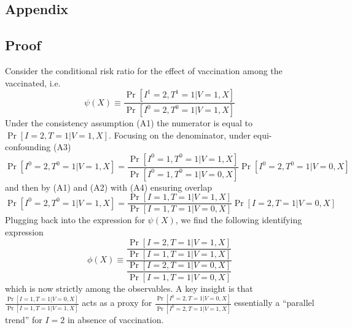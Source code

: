 
\begin{appendix}

    \renewcommand{\thefigure}{A\arabic{figure}}
    \setcounter{figure}{0}
    
    \renewcommand{\thetable}{A\arabic{table}}
    \setcounter{table}{0}
    
    \renewcommand{\theequation}{A\arabic{equation}}
    \setcounter{equation}{0}

    \newpage

    \section{Appendix}
    
    \subsection{Proof}
    Consider the conditional risk ratio for the effect of vaccination among the vaccinated, i.e.
    \begin{equation*}
        \psi(X) \equiv \dfrac{\Pr[I^1 = 2, T^1 = 1 | V = 1, X]}{\Pr[I^0 = 2, T^0 = 1 | V = 1, X]}
    \end{equation*}
    Under the consistency assumption (A1) the numerator is equal to $\Pr[I = 2, T = 1 | V = 1, X]$. Focusing on the denominator, under equi-confounding (A3)
    \begin{equation*}
    \Pr[I^0 = 2, T^0 = 1  | V = 1, X] = \frac{\Pr[I^0 = 1, T^0 = 1  | V = 1, X]}{\Pr[I^0 = 1, T^0 = 1  | V = 0, X]}\Pr[I^0 = 2, T^0 = 1 | V = 0, X]
    \end{equation*}
and then by (A1) and (A2) with (A4) ensuring overlap
    \begin{equation*}
     \Pr[I^0 = 2, T^0 = 1  | V = 1, X] = \frac{\Pr[I = 1, T = 1  | V = 1, X]}{\Pr[I = 1, T = 1  | V = 0, X]}\Pr[I = 2, T = 1 | V = 0, X]
    \end{equation*}
Plugging back into the expression for $\psi(X)$, we find the following identifying expression 
    \begin{equation*}
         \phi(X) \equiv \dfrac{\dfrac{\Pr[I = 2, T = 1 | V = 1, X]}{\Pr[I = 1, T = 1 | V = 1, X]}}{\dfrac{\Pr[I = 2, T = 1 | V = 0, X]}{\Pr[I = 1, T = 1 | V = 0, X]}}
    \end{equation*}
which is now strictly among the observables. A key insight is that $\frac{\Pr[I = 1, T =1  | V = 0, X]}{\Pr[I = 1, T = 1 | V = 1, X]}$ acts as a proxy for $\frac{\Pr[I^0 = 2, T =1  | V = 0, X]}{\Pr[I^0 = 2, T = 1 | V = 1, X]}$ essentially a ``parallel trend'' for $I=2$ in absence of vaccination.


\end{appendix}
